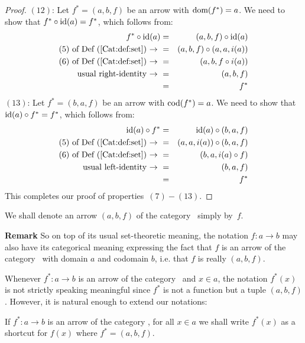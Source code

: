 \begin{proof}
    $(12)$: Let $f^{*}=(a,b,f)$ be an arrow with $\mbox{\rm dom}(f^{*})=a$. We need to 
    show that $f^{*}\circ\mbox{\rm id}(a)=f^{*}$, which follows from:
        \begin{eqnarray*}f^{*}\circ\mbox{\rm id}(a)
            &=&(a,b,f)\circ\mbox{\rm id}(a)\\
            \mbox{$(5)$ of Def~(\ref{Cat:def:set})\ $\rightarrow$\ } 
            &=&(a,b,f)\circ(a,a,i(a))\\
            \mbox{$(6)$ of Def~(\ref{Cat:def:set})\ $\rightarrow$\ } 
            &=&(a,b,f\circ i(a))\\
            \mbox{usual right-identity\ $\rightarrow$\ }
            &=&(a,b,f)\\
            &=&f^{*}
        \end{eqnarray*}
    $(13)$: Let $f^{*}=(b,a,f)$ be an arrow with $\mbox{\rm cod}(f^{*})=a$. We need to 
    show that $\mbox{\rm id}(a)\circ f^{*}=f^{*}$, which follows from:
        \begin{eqnarray*}\mbox{\rm id}(a)\circ f^{*}
            &=&\mbox{\rm id}(a)\circ(b,a,f)\\
            \mbox{$(5)$ of Def~(\ref{Cat:def:set})\ $\rightarrow$\ } 
            &=&(a,a,i(a))\circ(b,a,f)\\
            \mbox{$(6)$ of Def~(\ref{Cat:def:set})\ $\rightarrow$\ } 
            &=&(b,a,i(a)\circ f)\\
            \mbox{usual left-identity\ $\rightarrow$\ }
            &=&(b,a,f)\\
            &=&f^{*}
        \end{eqnarray*}
This completes our proof of properties~$(7)-(13)$.
\end{proof}

\begin{notation}\label{Cat:notation:set:arrow}
    We shall denote an arrow $(a,b,f)$ of the category \Set\ simply by~$f$. 
\end{notation}
\noindent
{\bf Remark} So on top of its usual set-theoretic meaning, the notation 
$f:a\to b$ may also have its categorical meaning expressing the fact 
that $f$ is an arrow of the category \Set\ with domain $a$ and codomain 
$b$, i.e. that $f$ is really $(a,b,f)$. 

Whenever $f^{*}:a\to b$ is an arrow of the category \Set\ and $x\in a$, the
notation $f^{*}(x)$ is not strictly speaking meaningful since $f^{*}$ is not
a function but a tuple $(a,b,f)$. However, it is natural enough
to extend our notations:

\begin{notation}\label{Cat:notation:set:arrow:apply}
    If $f^{*}:a \to b$ is an arrow of the category \Set, for all $x\in a$ 
    we shall write $f^{*}(x)$ as a shortcut for $f(x)$ where $f^{*}=(a,b,f)$.
\end{notation}

